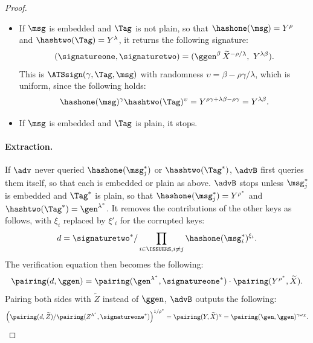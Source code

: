 \begin{proof}
\begin{itemize}
    \item If $\msg$ is embedded and $\Tag$ is not plain, so that $\hashone(\msg) =
Y^\rho$ and $\hashtwo(\Tag) = Y^\lambda$, it returns the following signature:
%
\begin{equation*}
  (\signatureone, \signaturetwo) = (\ggen^\beta\,\widetilde{X}^{-\rho/\lambda}, \
Y^{\lambda\beta}).
\end{equation*}
%
This is $\ATSsign(\gamma, \Tag, \msg)$ with randomness $\upsilon = \beta -
\rho\gamma/\lambda$, which is uniform, since the following holds:
%
\begin{equation*}
  \hashone(\msg)^\gamma \hashtwo(\Tag)^{\upsilon} = Y^{\rho\gamma + \lambda\beta -
\rho\gamma} = Y^{\lambda\beta}.
\end{equation*}

    \item If $\msg$ is embedded and $\Tag$ is plain, it stops.

  \end{itemize}

  \paragraph{Extraction.} If $\adv$ never queried $\hashone(\msg^*_j)$ or
$\hashtwo(\Tag^*)$, $\advB$ first queries them itself, so that each is embedded
or plain as above. $\advB$ stops unless $\msg^*_j$ is embedded and
$\Tag^*$ is plain, so that $\hashone(\msg^*_j) = Y^{\rho^*}$ and
$\hashtwo(\Tag^*) = \gen^{\lambda^*}$. It removes the contributions of the other
keys as follows, with $\xi_i$ replaced by $\xi'_i$ for the corrupted keys:
%
\begin{equation*}
  d = \signaturetwo^* / \prod_{i \in \ISSUERS, i \neq j}\hashone(\msg^*_i)^{\xi_i}.
\end{equation*}
%
The verification
equation then becomes the following:
%
\begin{equation*}
  \pairing(d, \ggen) = \pairing(\gen^{\lambda^*}, \signatureone^*) \cdot
\pairing(Y^{\rho^*}, \widetilde{X}).
\end{equation*}
%
Pairing both sides with $\widetilde{Z}$ instead of $\ggen$, $\advB$ outputs the
following:
%
\begin{equation*}
  \left(\pairing(d, \widetilde{Z}) / \pairing(Z^{\lambda^*},
\signatureone^*)\right)^{1/\rho^*} = \pairing(Y, \widetilde{X})^{\chi} =
\pairing(\gen, \ggen)^{\gamma\omega\chi}.
\end{equation*}


\end{proof}

